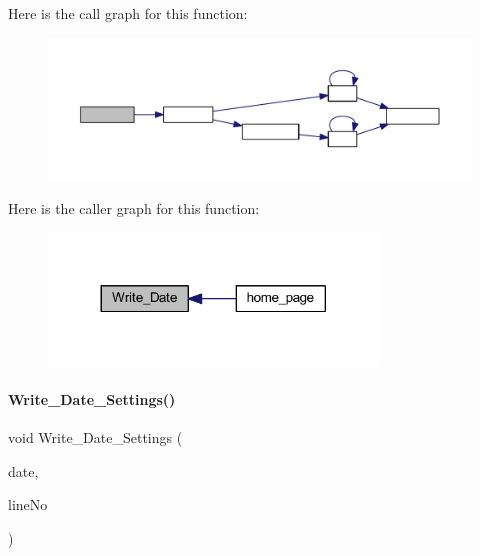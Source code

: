 Here is the call graph for this function\+:
\nopagebreak
\begin{figure}[H]
\begin{center}
\leavevmode
\includegraphics[width=350pt]{a00035_a897e97006c9f0d112306aac62288d408_cgraph}
\end{center}
\end{figure}
Here is the caller graph for this function\+:
\nopagebreak
\begin{figure}[H]
\begin{center}
\leavevmode
\includegraphics[width=248pt]{a00035_a897e97006c9f0d112306aac62288d408_icgraph}
\end{center}
\end{figure}
\mbox{\label{a00035_a754f53f3cd8f30c8c0211fdb4f548a31}} 
\paragraph{Write\+\_\+\+Date\+\_\+\+Settings()}
{\footnotesize\ttfamily void Write\+\_\+\+Date\+\_\+\+Settings (\begin{DoxyParamCaption}\item[{\textbf{ Date\+Time}}]{date,  }\item[{int}]{line\+No }\end{DoxyParamCaption})}

